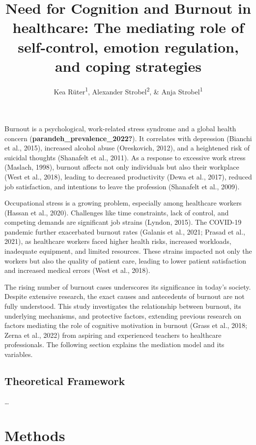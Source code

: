 \documentclass[
  man]{apa6}
\title{Need for Cognition and Burnout in healthcare: The mediating role of self-control, emotion regulation, and coping strategies}
\author{Kea Rüter\textsuperscript{1}, Alexander Strobel\textsuperscript{2}, \& Anja Strobel\textsuperscript{1}}
\date{}
\affiliation{\vspace{0.5cm}\textsuperscript{1} Department of Psychology, Technische Universität Chemnitz, Chemnitz, Germany\\\textsuperscript{2} Faculty of Psychology, Technische Universität Dresden, Dresden, Germany}
\begin{document}
\maketitle

Burnout is a psychological, work-related stress syndrome and a global health concern (\textbf{parandeh\_prevalence\_2022?}).
It correlates with depression (Bianchi et al., 2015), increased alcohol abuse (Oreskovich, 2012), and a heightened risk of suicidal thoughts (Shanafelt et al., 2011).
As a response to excessive work stress (Maslach, 1998), burnout affects not only individuals but also their workplace (West et al., 2018), leading to decreased productivity (Dewa et al., 2017), reduced job satisfaction, and intentions to leave the profession (Shanafelt et al., 2009).

Occupational stress is a growing problem, especially among healthcare workers (Hassan et al., 2020).
Challenges like time constraints, lack of control, and competing demands are significant job strains (Lyndon, 2015).
The COVID-19 pandemic further exacerbated burnout rates (Galanis et al., 2021; Prasad et al., 2021), as healthcare workers faced higher health risks, increased workloads, inadequate equipment, and limited resources.
These strains impacted not only the workers but also the quality of patient care, leading to lower patient satisfaction and increased medical errors (West et al., 2018).

The rising number of burnout cases underscores its significance in today's society.
Despite extensive research, the exact causes and antecedents of burnout are not fully understood.
This study investigates the relationship between burnout, its underlying mechanisms, and protective factors, extending previous research on factors mediating the role of cognitive motivation in burnout (Grass et al., 2018; Zerna et al., 2022) from aspiring and experienced teachers to healthcare professionals.
The following section explains the mediation model and its variables.

\subsection{Theoretical Framework}\label{theoretical-framework}

\ldots{}

\section{Methods}\label{methods}
\end{document}
